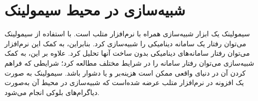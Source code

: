 \chapter{شبیه‌سازی  در محیط سیمولینک}
سیمولینک یک ابزار شبیه‌سازی همراه با نرم‌افزار متلب است.
با استفاده از سیمولینک می‌توان رفتار یک سامانه دینامیکی را شبیه‌سازی کرد. بنابراین، به کمک این نرم‌افزار می‌توان رفتار سامانه‌های دینامیکی بدون ساخت آنها تحلیل کرد. علاوه بر این، به کمک شبیه‌سازی می‌توان رفتار سامانه را در شرایط مختلف مطالعه کرد؛ شرایطی که فراهم کردن آن در دنیای واقعی ممکن است هزینه‌بر و  یا دشوار باشد. سیمولینک به صورت یک افزونه در نرم‌افزار متلب عرضه شده‌است که شبیه‌سازی در محیط آن به‌صورت دیاگرام‌های بلوکی انجام می‌شود.